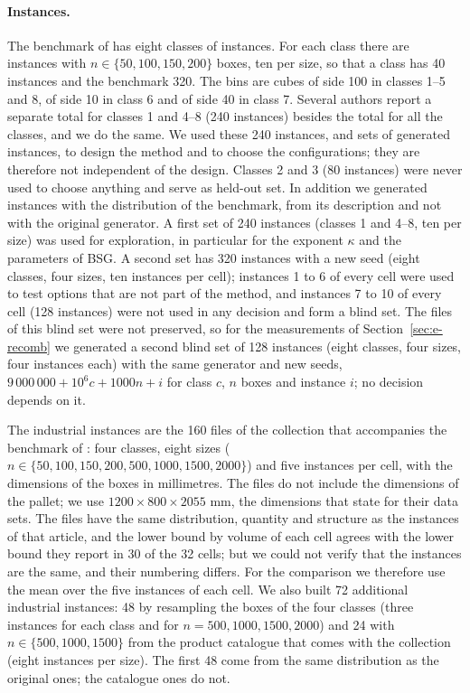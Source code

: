 \paragraph{Instances.}
The benchmark of \citet{Martello2000} has eight classes of instances. For each class there are
instances with $n\in\{50,100,150,200\}$ boxes, ten per size, so that a class has 40 instances and
the benchmark 320. The bins are cubes of side 100 in classes 1--5 and 8, of side 10 in class 6 and
of side 40 in class 7. Several authors report a separate total for classes 1 and 4--8 (240 instances) besides the total for all the classes, and we do the same. We used these 240 instances, and sets of generated instances, to
design the method and to choose the configurations; they are therefore not independent of the
design. Classes 2 and 3 (80 instances) were never used to choose anything and serve as held-out
set. In addition we generated instances with the distribution of the benchmark, from its
description and not with the original generator. A first set of 240 instances (classes 1 and
4--8, ten per size) was used for exploration, in particular for the exponent $\kappa$ and the
parameters of BSG. A second set has 320 instances with a new seed (eight classes, four sizes,
ten instances per cell); instances 1 to 6 of every cell were used to test options that are not part of the method, and instances 7 to 10 of every cell (128 instances) were not used in any
decision and form a blind set. The files of this blind set were not preserved, so for the measurements of Section~\ref{sec:e-recomb} we generated a second blind set of 128 instances (eight classes, four sizes,
four instances each) with the same generator and new seeds, $9\,000\,000+10^6c+1000n+i$ for class $c$, $n$ boxes and instance $i$; no decision depends on it.

The industrial instances are the 160 files of the collection that accompanies the benchmark of
\citet{Elhedhli2019}: four classes, eight sizes ($n\in\{50,100,150,200,500,1000,1500,2000\}$) and
five instances per cell, with the dimensions of the boxes in millimetres. The files do not include
the dimensions of the pallet; we use $1200\times 800\times 2055$ mm, the dimensions that
\citet{Elhedhli2019} state for their data sets. The files have the same distribution, quantity and
structure as the instances of that article, and the lower bound by volume of each cell agrees with
the lower bound they report in 30 of the 32 cells; but we could not verify that the instances are the
same, and their numbering differs. For the comparison we therefore use the mean over the five instances of each cell.
We also built 72 additional industrial instances: 48 by resampling the boxes of the four classes
(three instances for each class and for $n=500,1000,1500,2000$) and 24 with $n\in\{500,1000,1500\}$ from the product
catalogue that comes with the collection (eight instances per size). The first 48 come from the same
distribution as the original ones; the catalogue ones do not.

